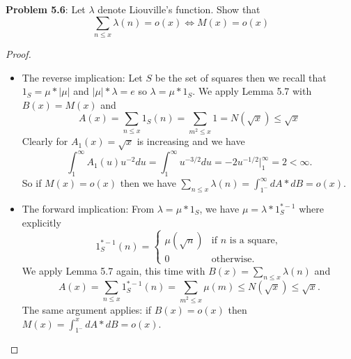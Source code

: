 \documentclass[12pt]{article}
\begin{document}
\fi

\textbf{Problem 5.6}: Let $\lambda$ denote Liouville's function. Show that
$$\sum_{n \leq x} \lambda(n) = o(x) \iff M(x) = o(x)$$

\begin{proof}
\begin{itemize}
\item The reverse implication: Let $S$ be the set of squares then we recall that $1_S = \mu * |\mu|$ and $|\mu| * \lambda = e$ so $\lambda = \mu * 1_S$. We apply Lemma 5.7 with $B(x) = M(x)$ and
$$A(x) = \sum_{n \leq x} 1_S(n) = \sum_{m^2 \leq x} 1 = N(\sqrt{x}) \leq \sqrt{x}$$
Clearly for $A_1(x) = \sqrt{x}$ is increasing and we have
$$\int_1^\infty A_1(u) u^{-2} du = \int_1^\infty u^{-3/2} du = -2u^{-1/2}|_1^\infty = 2 < \infty.$$
So if $M(x) = o(x)$ then we have $\sum_{n \leq x} \lambda(n) = \int_{1^-}^{\infty} dA * dB = o(x).$

\item The forward implication: From $\lambda = \mu * 1_S$, we have $\mu = \lambda * 1_S^{*-1}$ where explicitly
$$1_S^{*-1}(n) = \begin{cases} \mu(\sqrt{n}) &\text{if } n \text{ is a square}, \\ 0 &\text{otherwise}.\end{cases}$$
We apply Lemma 5.7 again, this time with $B(x) = \sum_{n \leq x} \lambda(n)$ and
$$A(x) = \sum_{n \leq x} 1_S^{*-1}(n) = \sum_{m^2 \leq x} \mu(m) \leq N(\sqrt{x}) \leq \sqrt{x}.$$
The same argument applies: if $B(x) = o(x)$ then $M(x) = \int_{1^-}^x dA * dB = o(x)$.
\end{itemize}
\end{proof}

\unless\ifdefined\IsMainDocument
\end{document}
